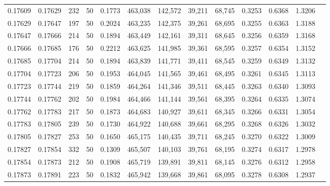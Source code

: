 \begin{tabular}{rrrrrrrrrrrrr}
0.17609 & 0.17629 &   232 &  50 &                                     0.1773 & 463,038 & 142,572 &  39,211 &  68,745 & 0.3253 & 0.6368 & 1.3206 \\
0.17629 & 0.17647 &   197 &  50 &                                     0.2024 & 463,235 & 142,375 &  39,261 &  68,695 & 0.3255 & 0.6363 & 1.3188 \\
0.17647 & 0.17666 &   214 &  50 &                                     0.1894 & 463,449 & 142,161 &  39,311 &  68,645 & 0.3256 & 0.6359 & 1.3168 \\
0.17666 & 0.17685 &   176 &  50 &                                     0.2212 & 463,625 & 141,985 &  39,361 &  68,595 & 0.3257 & 0.6354 & 1.3152 \\
0.17685 & 0.17704 &   214 &  50 &                                     0.1894 & 463,839 & 141,771 &  39,411 &  68,545 & 0.3259 & 0.6349 & 1.3132 \\
0.17704 & 0.17723 &   206 &  50 &                                     0.1953 & 464,045 & 141,565 &  39,461 &  68,495 & 0.3261 & 0.6345 & 1.3113 \\
0.17723 & 0.17744 &   219 &  50 &                                     0.1859 & 464,264 & 141,346 &  39,511 &  68,445 & 0.3263 & 0.6340 & 1.3093 \\
0.17744 & 0.17762 &   202 &  50 &                                     0.1984 & 464,466 & 141,144 &  39,561 &  68,395 & 0.3264 & 0.6335 & 1.3074 \\
0.17762 & 0.17783 &   217 &  50 &                                     0.1873 & 464,683 & 140,927 &  39,611 &  68,345 & 0.3266 & 0.6331 & 1.3054 \\
0.17783 & 0.17805 &   239 &  50 &                                     0.1730 & 464,922 & 140,688 &  39,661 &  68,295 & 0.3268 & 0.6326 & 1.3032 \\
0.17805 & 0.17827 &   253 &  50 &                                     0.1650 & 465,175 & 140,435 &  39,711 &  68,245 & 0.3270 & 0.6322 & 1.3009 \\
0.17827 & 0.17854 &   332 &  50 &                                     0.1309 & 465,507 & 140,103 &  39,761 &  68,195 & 0.3274 & 0.6317 & 1.2978 \\
0.17854 & 0.17873 &   212 &  50 &                                     0.1908 & 465,719 & 139,891 &  39,811 &  68,145 & 0.3276 & 0.6312 & 1.2958 \\
0.17873 & 0.17891 &   223 &  50 &                                     0.1832 & 465,942 & 139,668 &  39,861 &  68,095 & 0.3278 & 0.6308 & 1.2937 \\

\end{tabular}
